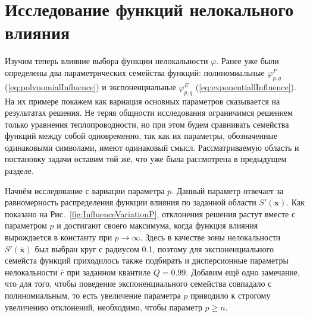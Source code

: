 \section{Исследование функций нелокального влияния}\label{sec:ResultsAnalysis/KeyFeatures}

Изучим теперь влияние выбора функции нелокальности $\varphi$. Ранее уже были определены два параметрических семейства функций: полиномиальные $\varphi^P_{p,q}$ (\ref{eq:polynomialInfluence}) и экспоненциальные $\varphi^E_{p,q}$ (\ref{eq:exponentiallInfluence}). На их примере покажем как вариация основных параметров сказывается на результатах решения. Не теряя общности исследования ограничимся решением только уравнения теплопроводности, но при этом будем сравнивать семейства функций между собой одновременно, так как их параметры, обозначенные одинаковыми символами, имеют одинаковый смысл. Рассматриваемую область и постановку задачи оставим той же, что уже была рассмотрена в предыдущем разделе.

Начнём исследование с вариации параметра $p$. Данный параметр отвечает за равномерность распределения функции влияния по заданной области $S'(\boldsymbol{x})$. Как показано на Рис.~\ref{fig:InfluenceVariationP}, отклонения решения растут вместе с параметром $p$ и достигают своего максимума, когда функция влияния вырождается в константу при $p \rightarrow \infty$. Здесь в качестве зоны нелокальности $S'(\overline{\boldsymbol{x}})$ был выбран круг с радиусом 0.1, поэтому для экспоненциального семейста функций приходилось также подбирать и дисперсионные параметры нелокальности $\overline{r}$ при заданном квантиле $Q = 0.99$. Добавим ещё одно замечание, что для того, чтобы поведение экспоненциального семейства совпадало с полиномиальным, то есть увеличение параметра $p$ приводило к строгому увеличению отклонений, необходимо, чтобы параметр $p \geqslant n$.

